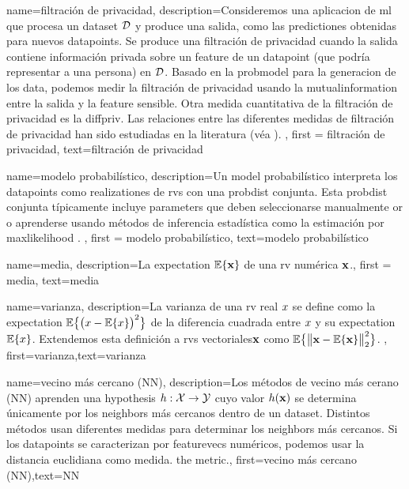 {{
{
	name=filtración de privacidad,
	description={Consideremos una aplicacion de \gls{ml} que procesa un
	\gls{dataset} $\mathcal{D}$ y produce una salida, como las \gls{prediction}es 
	obtenidas para nuevos \gls{datapoint}s. Se produce una filtración de privacidad 
	cuando la salida contiene información privada sobre un \gls{feature} de un 
	\gls{datapoint} (que podría representar a una persona) en $\mathcal{D}$. Basado en la \gls{probmodel} 
	para la generacion de los \gls{data}, podemos medir la filtración de privacidad usando la \gls{mutualinformation} 
	entre la salida y la \gls{feature} sensible. Otra medida cuantitativa de la filtración de privacidad 
	es la \gls{diffpriv}. Las relaciones entre las diferentes medidas de filtración de privacidad han sido estudiadas en la literatura (véa \cite{InfThDiffPriv}). 
	}, 
	first = {filtración de privacidad}, text={filtración de privacidad} 
}



{
	name=modelo probabilístico,
	description={Un \gls{model} probabilístico interpreta los \gls{datapoint}s 
		como \gls{realization}es de \gls{rv}s con una \gls{probdist} conjunta. Esta \gls{probdist} conjunta típicamente 
		incluye \gls{parameters} que deben seleccionarse manualmente or o aprenderse usando métodos de inferencia estadística  
		como la estimación por \gls{maxlikelihood} \cite{LC}. }, 
	first = {modelo probabilístico}, text={modelo probabilístico} 
}



{
	name=media,
	description={La \gls{expectation} $\mathbb{E} \{ {\bf x} \}$ de una \gls{rv} numérica ${\bf x}$.}, 
		first = {media}, text={media} 
}

{
	name={varianza},
	description={La varianza de una \gls{rv} real $x$ se define como la \gls{expectation} 
		$\mathbb{E}\big\{ \big( x - \mathbb{E}\{x \} \big)^{2} \big\}$ de la diferencia cuadrada entre $x$ 
		y su \gls{expectation} $\mathbb{E}\{x \}$. Extendemos esta definición a \gls{rv}s vectoriales${\bf x}$ 
		como $\mathbb{E}\big\{ \big\| {\bf x} - \mathbb{E}\{{\bf x} \} \big\|_{2}^{2} \big\}$.} ,
		first={varianza},text={varianza} 
}

{
	name={vecino más cercano (NN)},
	description={Los métodos de vecino más cerano (NN) aprenden una \gls{hypothesis} 
		$h: \mathcal{X} \rightarrow \mathcal{Y}$ cuyo valor $h({\bf x})$ 
		se determina únicamente por los \gls{neighbors} más cercanos dentro de un \gls{dataset}. Distintos 
		métodos usan diferentes medidas para determinar los \gls{neighbors} más cercanos. Si los \gls{datapoint}s 
		se caracterizan por \gls{featurevec}s numéricos, podemos usar la distancia euclidiana como medida.  
		the metric.},
	first={vecino más cercano (NN)},text={NN} 
}

}}
